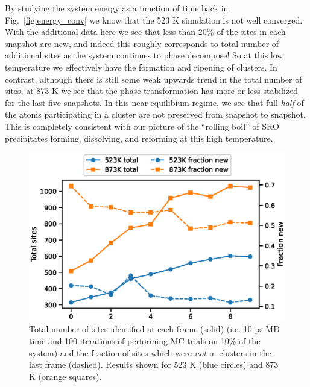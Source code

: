 By studying the system energy as a function of time back in Fig.~\ref{fig:energy_conv} we know that the 523 K simulation is not well converged.
With the additional data here we see that less than 20\% of the \DOTHREE sites in each snapshot are new, and indeed this roughly corresponds to total number of additional sites as the system continues to phase decompose!
So at this low temperature we effectively have the formation and ripening of clusters.
In contrast, although there is still some weak upwards trend in the total number of \DOTHREE sites, at 873 K we see that the phase transformation has more or less stabilized for the last five snapshots.
In this near-equilibium regime, we see that full \emph{half} of the atoms participating in a \DOTHREE cluster are not preserved from snapshot to snapshot.
This is completely consistent with our picture of the ``rolling boil'' of SRO precipitates forming, dissolving, and reforming at this high temperature.

\begin{figure}[h]
    \centering
    \includegraphics[width=\textwidth,height=0.75\textheight,keepaspectratio]{figures/cluster_turnover}
    \caption{Total number of \DOTHREE sites identified at each frame (solid) (i.e. 10 ps MD time and 100 iterations of performing MC trials on 10\% of the system) and the fraction of sites which were \emph{not} in clusters in the last frame (dashed). Results shown for 523 K (blue circles) and 873 K (orange squares).}
    \label{fig:turnover}
\end{figure}


